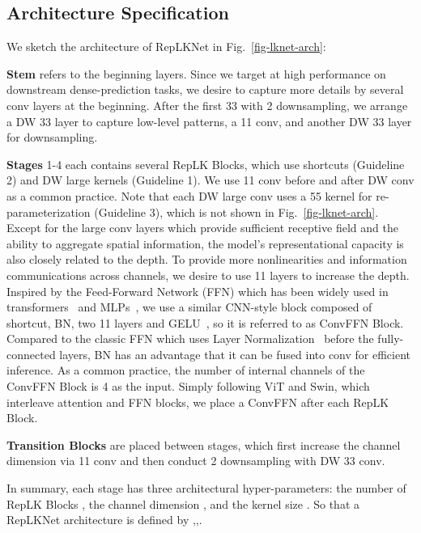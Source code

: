 \documentclass[10pt,twocolumn,letterpaper]{article}
\begin{document}
	
	\subsection{Architecture Specification}
	
	We sketch the architecture of RepLKNet in Fig.~\ref{fig-lknet-arch}:
	
	\textbf{Stem} refers to the beginning layers. Since we target at high performance on downstream dense-prediction tasks, we desire to capture more details by several conv layers at the beginning. After the first 33 with 2 downsampling, we arrange a DW 33 layer to capture low-level patterns, a 11 conv, and another DW 33 layer for downsampling. 
	
\textbf{Stages} 1-4 each contains several RepLK Blocks, which use shortcuts (Guideline 2) and DW large kernels (Guideline 1). We use 11 conv before and after DW conv as a common practice. Note that each DW large conv uses a 55 kernel for re-parameterization (Guideline 3), which is not shown in Fig.~\ref{fig-lknet-arch}. Except for the large conv layers which provide sufficient receptive field and the ability to aggregate spatial information, the model's representational capacity is also closely related to the depth. To provide more nonlinearities and information communications across channels, we desire to use 11 layers to increase the depth. Inspired by the Feed-Forward Network (FFN) which has been widely used in transformers~\cite{vit,swin} and MLPs~\cite{tolstikhin2021mlp,touvron2021resmlp,ding2021repmlpnet}, we use a similar CNN-style block composed of shortcut, BN, two 11 layers and GELU~\cite{hendrycks2016gaussian}, so it is referred to as ConvFFN Block. Compared to the classic FFN which uses Layer Normalization~\cite{ba2016layer} before the fully-connected layers, BN has an advantage that it can be fused into conv for efficient inference. As a common practice, the number of internal channels of the ConvFFN Block is 4 as the input. Simply following ViT and Swin, which interleave attention and FFN blocks, we place a ConvFFN after each RepLK Block.
	
	\textbf{Transition Blocks} are placed between stages, which first increase the channel dimension via 11 conv and then conduct 2 downsampling with DW 33 conv.
	
	In summary, each stage has three architectural hyper-parameters: the number of RepLK Blocks , the channel dimension , and the kernel size . So that a RepLKNet architecture is defined by ,,.
	
\end{document}
